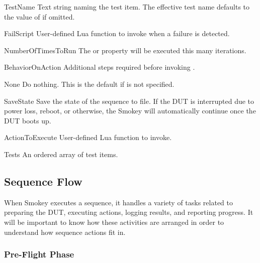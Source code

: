 \begin{Property}

\item[TestName] Text string naming the test item.  The effective test name
defaults to the value of  if omitted.

\item[FailScript] User-defined Lua function to invoke when a failure is
detected.

\item[NumberOfTimesToRun] The  or  property
will be executed this many iterations.

\item[BehaviorOnAction] Additional steps required before invoking
.

	\begin{Definition}

	\item[None] Do nothing.  This is the default if 
	is not specified.

	\item[SaveState] Save the state of the sequence to file.  If the DUT is
	interrupted due to power loss, reboot, or otherwise, the Smokey will
	automatically continue once the DUT boots up.

	\end{Definition}

\item[ActionToExecute] User-defined Lua function to invoke.

\item[Tests] An ordered array of test items.

\end{Property}

\subsection{Sequence Flow}

When Smokey executes a sequence, it handles a variety of tasks related to
preparing the DUT, executing actions, logging results, and reporting progress.
It will be important to know how these activities are arranged in order to
understand how sequence actions fit in.

\subsubsection{Pre-Flight Phase}

